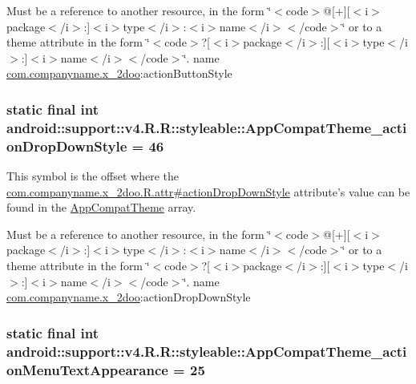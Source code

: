 Must be a reference to another resource, in the form \char`\"{}$<$code$>$@\mbox{[}+\mbox{]}\mbox{[}$<$i$>$package$<$/i$>$:\mbox{]}$<$i$>$type$<$/i$>$:$<$i$>$name$<$/i$>$$<$/code$>$\char`\"{} or to a theme attribute in the form \char`\"{}$<$code$>$?\mbox{[}$<$i$>$package$<$/i$>$:\mbox{]}\mbox{[}$<$i$>$type$<$/i$>$:\mbox{]}$<$i$>$name$<$/i$>$$<$/code$>$\char`\"{}.  name \hyperlink{namespacecom_1_1companyname_1_1x__2doo}{com.companyname.x\_\-2doo}:actionButtonStyle \hypertarget{classandroid_1_1support_1_1v4_1_1_r_1_1styleable_cea968e94c1465c9f1c390fe9de9567c}{
\subsubsection[{AppCompatTheme\_\-actionDropDownStyle}]{\setlength{\rightskip}{0pt plus 5cm}static final int android::support::v4.R.R::styleable::AppCompatTheme\_\-actionDropDownStyle = 46}}
\label{classandroid_1_1support_1_1v4_1_1_r_1_1styleable_cea968e94c1465c9f1c390fe9de9567c}


This symbol is the offset where the \hyperlink{classcom_1_1companyname_1_1x__2doo_1_1_r_1_1attr_2f1778415db338ada8ef074c30b230c4}{com.companyname.x\_\-2doo.R.attr\#actionDropDownStyle} attribute's value can be found in the \hyperlink{classandroid_1_1support_1_1v4_1_1_r_1_1styleable_0873e92ba21076bb5a4aeadeb7f5779f}{AppCompatTheme} array.

Must be a reference to another resource, in the form \char`\"{}$<$code$>$@\mbox{[}+\mbox{]}\mbox{[}$<$i$>$package$<$/i$>$:\mbox{]}$<$i$>$type$<$/i$>$:$<$i$>$name$<$/i$>$$<$/code$>$\char`\"{} or to a theme attribute in the form \char`\"{}$<$code$>$?\mbox{[}$<$i$>$package$<$/i$>$:\mbox{]}\mbox{[}$<$i$>$type$<$/i$>$:\mbox{]}$<$i$>$name$<$/i$>$$<$/code$>$\char`\"{}.  name \hyperlink{namespacecom_1_1companyname_1_1x__2doo}{com.companyname.x\_\-2doo}:actionDropDownStyle \hypertarget{classandroid_1_1support_1_1v4_1_1_r_1_1styleable_5430afc19e0b78b7dc7aee394d785df7}{
\subsubsection[{AppCompatTheme\_\-actionMenuTextAppearance}]{\setlength{\rightskip}{0pt plus 5cm}static final int android::support::v4.R.R::styleable::AppCompatTheme\_\-actionMenuTextAppearance = 25}}
\label{classandroid_1_1support_1_1v4_1_1_r_1_1styleable_5430afc19e0b78b7dc7aee394d785df7}


